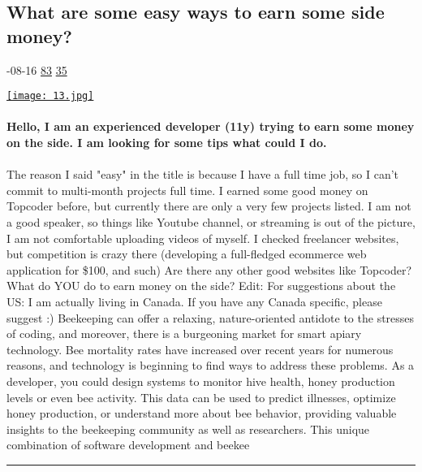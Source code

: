 \documentclass[10pt,a4paper]{article}
\begin{document}
\begin{multicols}{2}
\begin{minipage}{\linewidth}
\subsection{What are some easy ways to earn some side money?}
\textsc{\footnotesize
{\scriptsize\faCalendar}-08-16 
{\scriptsize\faThumbsOUp}\space 
\href{http://news.ycombinator.com/item?id=37138807\&utm\_term=comment}{83} 
{\scriptsize\faComments}\space 
\href{http://news.ycombinator.com/item?id=37138807\&utm\_term=comment}{35} 
}
\par\medskip\noindent
\href{https://news.ycombinator.com/item?id=37150862\&utm\_source=hackernewsletter\&utm\_medium=email\&utm\_term=ask\_hn}{
    \texttt{[image: 13.jpg]}
}
\end{minipage}
\paragraph{}
\textbf{Hello,
I am an experienced developer (11y) trying to earn some money on the side.
I am looking for some tips what could I do.}
\paragraph{}

The reason I said "easy" in the title is because I have a full time job, so I can't commit to multi-month projects full time.
I earned some good money on Topcoder before, but currently there are only a very few projects listed.
I am not a good speaker, so things like Youtube channel, or streaming is out of the picture, I am not comfortable uploading videos of myself.
I checked freelancer websites, but competition is crazy there (developing a full-fledged ecommerce web application for \$100, and such)
Are there any other good websites like Topcoder?
What do YOU do to earn money on the side?
Edit: For suggestions about the US: I am actually living in Canada. If you have any Canada specific, please suggest :)
Beekeeping can offer a relaxing, nature-oriented antidote to the stresses of coding, and moreover, there is a burgeoning market for smart apiary technology. Bee mortality rates have increased over recent years for numerous reasons, and technology is beginning to find ways to address these problems.
As a developer, you could design systems to monitor hive health, honey production levels or even bee activity. This data can be used to predict illnesses, optimize honey production, or understand more about bee behavior, providing valuable insights to the beekeeping community as well as researchers.
This unique combination of software development and beekee
\par\noindent\textcolor{red}{\rule{\linewidth}{0.2mm}}
\vfill
\null
\end{multicols}
\end{document}
